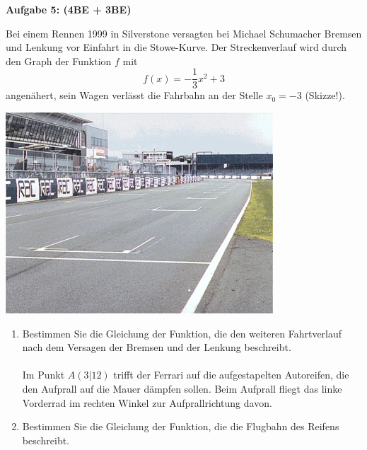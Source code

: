 \documentclass[a4paper,12pt]{article}
\newcommand{\Aufgabe}[1]{
  {
  \vspace*{0.5cm}
  \textsf{\textbf{Aufgabe #1}}
  \vspace*{0.2cm}
  
  }
}
\begin{document}
\Aufgabe{5: (4BE + 3BE)}
\noindent
\begin{minipage}{0.6\textwidth}%
Bei einem Rennen 1999 in Silverstone versagten bei Michael Schumacher Bremsen und Lenkung vor Einfahrt in die Stowe-Kurve. Der Streckenverlauf wird durch den Graph der Funktion $f$ mit
\[f(x)=-\frac{1}{3}x^2+3 \]
  angenähert, sein Wagen verlässt die Fahrbahn an der Stelle $x_0 = -3$ (Skizze!).
\end{minipage}
\hfill%
\begin{minipage}{0.3\textwidth}%
\includegraphics[width=\linewidth]{Q11_1KlausurJanuar2022_3.png}
\end{minipage}%



\begin{enumerate}[label={\alph*)}]
  \item Bestimmen Sie die Gleichung der Funktion, die den weiteren Fahrtverlauf nach dem Versagen der Bremsen und der Lenkung beschreibt.\\
    \\
    Im Punkt $A(3|12)$ trifft der Ferrari auf die aufgestapelten Autoreifen, die den Aufprall auf die Mauer dämpfen sollen. Beim Aufprall fliegt das linke Vorderrad im rechten Winkel zur Aufprallrichtung davon.
  \item Bestimmen Sie die Gleichung der Funktion, die die Flugbahn des Reifens beschreibt.
\end{enumerate}
\end{document}

